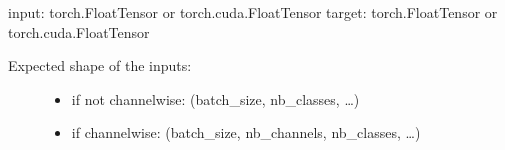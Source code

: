 \documentclass[letterpaper,10pt,english]{sphinxmanual}
\begin{document}
\begin{fulllineitems}
\begin{savenotes}\sphinxattablestart
\centering
\begin{tabulary}{\linewidth}[t]{|T|T|}
\hline

&\\
\hline
\end{tabulary}
\par
\sphinxattableend\end{savenotes}

\begin{fulllineitems}
\label{\detokenize{index:pathflowai.losses.GeneralizedDiceLoss.forward}}
input: torch.FloatTensor or torch.cuda.FloatTensor
target:     torch.FloatTensor or torch.cuda.FloatTensor
\begin{description}
\item[{Expected shape of the inputs:}] \leavevmode\begin{itemize}
\item {} 
if not channelwise: (batch\_size, nb\_classes, …)

\item {} 
if channelwise:     (batch\_size, nb\_channels, nb\_classes, …)

\end{itemize}

\end{description}

\end{fulllineitems}


\end{fulllineitems}


\begin{fulllineitems}
\label{\detokenize{index:pathflowai.losses.ShapeError}}~
\end{fulllineitems}

\end{document}
